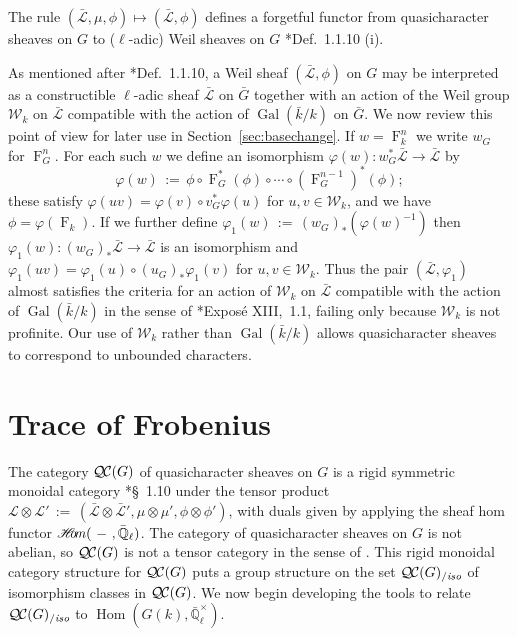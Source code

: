 \documentclass[11pt]{amsart}
\theoremstyle{plain}
\theoremstyle{definition}
\theoremstyle{remark}
\newcommand{\EE}{\mathbb{\bar Q}_\ell}
\newcommand{\bFq}{\bar{k}}
\newcommand{\Fq}{k}
\newcommand{\EEx}{\EE^\times}
\DeclareMathOperator{\Gal}{Gal}
\newcommand{\Frob}[1]{\operatorname{F}_{#1}}
\DeclareMathOperator{\Hom}{Hom}
\newcommand{\sheafHom}{{\mathscr{H}\hskip-4pt{\it o}\hskip-2pt{\it m}}}
\newcommand{\ceq}{{\, :=\, }}
\newcommand{\qcs}[1]{{\mathcal{#1}}}
\newcommand{\gqcs}[1]{{\mathcal{\bar #1}}}
\newcommand{\QC}{{\mathcal{Q\hskip-0.8pt C}}}
\newcommand{\QCiso}[1]{\QC(#1)_{/\textit{iso}}}
\newcommand{\Weil}[1]{\mathcal{W}_{#1}}
\newcommand{\bG}{\bar{G}}
\newcommand\David[1]{\marginpar{\smaller\smaller DR: #1}}
\begin{document}
The rule $(\gqcs{L},\mu,\phi) \mapsto (\gqcs{L},\phi)$ defines a forgetful functor from quasicharacter
sheaves on $G$ to ($\ell$-adic) Weil sheaves on $G$ \cite{deligne:80a}*{Def.~1.1.10 (i)}.

As mentioned after \cite{deligne:80a}*{Def.~1.1.10}, a Weil sheaf $(\gqcs{L},\phi)$ on $G$
may be interpreted as a constructible $\ell$-adic sheaf $\gqcs{L}$ on $\bG$ together with
an action of the Weil group $\Weil{\Fq}$ on $\gqcs{L}$ compatible with the action of
$\Gal(\bFq/\Fq)$ on $\bG$. We now review this point of view for later use in
Section~\ref{sec:basechange}.  If $w = \Frob{\Fq}^n$ we write $w_G$ for $\Frob{G}^n$.
For each such $w$ we define an isomorphism $\varphi(w) : w_G^* \gqcs{L}\to \gqcs{L}$ by
\[
\varphi(w) \ceq  \phi \circ \Frob{G}^*(\phi) \circ \cdots \circ (\Frob{G}^{n-1})^*(\phi);
\]
these satisfy $\varphi(uv) = \varphi(v) \circ v_G^* \varphi(u)$ for $u,v\in \Weil{\Fq}$, and
we have $\phi = \varphi(\Frob{\Fq})$. 
If we further define $\varphi_1(w) \ceq (w_G)_*(\varphi(w)^{-1})$ then
$\varphi_1(w) : (w_G)_* \gqcs{L}\to \gqcs{L}$ is an isomorphism and
$\varphi_1(uv) = \varphi_1(u) \circ (u_G)_* \varphi_1(v)$ for $u,v\in \Weil{\Fq}$.
Thus the pair $(\gqcs{L},\varphi_1)$ almost satisfies the criteria for an action of $\Weil{\Fq}$
on $\gqcs{L}$ compatible with the action of $\Gal(\bFq/\Fq)$ in the sense of
\cite{deligne:SGA4.5}*{Expos\'e XIII,~1.1}, failing only because $\Weil{\Fq}$ is not profinite.
Our use of $\Weil{\Fq}$ rather than $\Gal(\bFq/\Fq)$ allows quasicharacter sheaves to
correspond to unbounded characters.

\section{Trace of Frobenius}\label{sec:Frob}

The category $\QC(G)$ of quasicharacter sheaves on $G$ is a rigid symmetric monoidal category
\cite{etingof:09a}*{\S~1.10} under the tensor product
$\qcs{L} \otimes \qcs{L'} \ceq (\gqcs{L}\otimes\gqcs{L'}, \mu\otimes\mu', \phi\otimes \phi')$,
with duals given by applying the sheaf hom functor 
$\sheafHom(\ - \ ,\EE)$.
The category of quasicharacter sheaves on $G$ is not abelian, so $\QC(G)$
is not a tensor category in the sense of \cite{deligne:02a}. \David{more specific citation}
This rigid monoidal category structure for $\QC(G)$ puts a group
structure on the set $\QCiso{G}$ of isomorphism classes in $\QC(G)$.
We now begin developing the tools to relate $\QCiso{G}$ to $\Hom(G(\Fq), \EEx)$.
\end{document}
